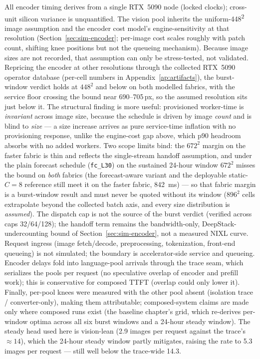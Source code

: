 All encoder timing derives from a single RTX~5090 node (locked clocks);
cross-unit silicon variance is unquantified. The vision pool inherits
the uniform-448\textsuperscript{2}
image assumption and the encoder cost model's engine-sensitivity at that
resolution (Section~\ref{sec:sim-encoder}; per-image cost scales roughly with patch
count, shifting knee positions but not the queueing mechanism). Because
image sizes are not
recorded, that assumption can only be stress-tested, not validated.
Repricing the encoder at other resolutions through the collected RTX~5090
operator database (per-cell numbers in Appendix~\ref{ap:artifacts}), the
burst-window verdict holds at $448^2$ and below on both modelled fabrics,
with the service floor crossing the bound near 690--705\,px, so the assumed
resolution sits just below it. The structural finding is more useful:
provisioned worker-time is \emph{invariant} across image size, because the
schedule is driven by image \emph{count} and is blind to \emph{size} --- a
size increase arrives as pure service-time inflation with no provisioning
response, unlike the engine-cost gap above, which p90 headroom absorbs with
no added workers. Two scope limits bind: the $672^2$ margin on the faster
fabric is thin and reflects the single-stream handoff assumption, and under
the plain forecast schedule (\texttt{fc\_L30}) on the sustained 24-hour window
$672^2$ misses the bound on \emph{both} fabrics (the forecast-aware variant and
the deployable static-$C{=}8$ reference still meet it on the faster fabric,
\SI{842}{\milli\second}) ---
so that fabric margin is a burst-window result and must never be quoted
without its window ($896^2$ cells extrapolate beyond the collected batch
axis, and every size distribution is \emph{assumed}). The dispatch cap is
not the source of the burst verdict (verified across caps 32/64/128); the
handoff term remains the bandwidth-only, DeepStack-undercounting bound of
Section~\ref{sec:sim-encoder}, not a measured NIXL curve. Request ingress (image fetch/decode,
preprocessing, tokenization, front-end queueing) is not simulated;
the boundary is accelerator-side service and queueing.
Encoder delays fold into language-pool arrivals through the trace seam,
which serializes the pools per request (no speculative overlap of encoder
and prefill work); this is conservative for composed TTFT (overlap could only
lower it). Finally, per-pool knees were measured with the other pool
absent (isolation trace / converter-only), making them attributable;
composed-system claims are made only where composed runs exist (the baseline
chapter's grid, which re-derives per-window optima across all six burst
windows and a 24-hour steady window). The steady head used here is
vision-lean (2.9 images per request against the trace's ${\approx}14$),
which the 24-hour steady window partly mitigates, raising the rate to 5.3
images per request --- still well below the trace-wide 14.3.

